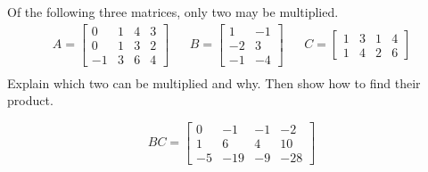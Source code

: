 
\begin{exerciseStatement}


Of the following three matrices, only two may be multiplied. 
\begin{align*} A= \left[\begin{array}{cccc}
0 & 1 & 4 & 3 \\
0 & 1 & 3 & 2 \\
-1 & 3 & 6 & 4
\end{array}\right]  & & B= \left[\begin{array}{cc}
1 & -1 \\
-2 & 3 \\
-1 & -4
\end{array}\right]  & & C= \left[\begin{array}{cccc}
1 & 3 & 1 & 4 \\
1 & 4 & 2 & 6
\end{array}\right]  \\ \end{align*}
             Explain which two can be multiplied and why. Then show how to find their product.


\end{exerciseStatement}
    
\begin{exerciseAnswer} 
\[BC= \left[\begin{array}{cccc}
0 & -1 & -1 & -2 \\
1 & 6 & 4 & 10 \\
-5 & -19 & -9 & -28
\end{array}\right] \]
\end{exerciseAnswer}
    
